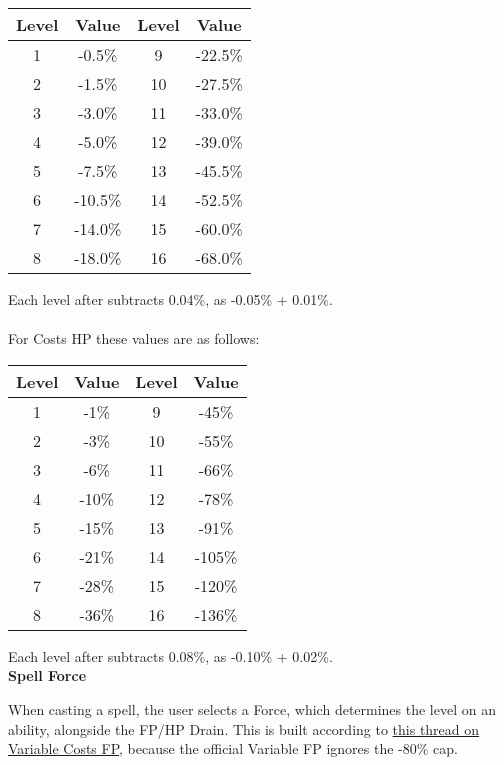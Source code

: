 \begin{multicols*}{2}
	\begin{center}\label{drain_mods}
		\begin{tabular}{|c|c|c|c|}
			\hline
			Level & Value & Level & Value \\
			\hline
			\hline
			1 & -0.5\% & 9 & -22.5\% \\
			2 & -1.5\% & 10 & -27.5\% \\
			3 & -3.0\% & 11 & -33.0\% \\
			4 & -5.0\% & 12 & -39.0\% \\
			5 & -7.5\% & 13 & -45.5\% \\
			6 & -10.5\% & 14 & -52.5\% \\
			7 & -14.0\% & 15 & -60.0\% \\
			8 & -18.0\% & 16 & -68.0\% \\
			\hline
		\end{tabular}
	\end{center}
	
	Each level after subtracts 0.04\%, as -0.05\% + 0.01\%.
	\\\\
	For Costs HP these values are as follows:
	\begin{center}
		\begin{tabular}{|c|c|c|c|}
			\hline
			Level & Value & Level & Value \\
			\hline
			\hline
			1 & -1\% & 9 & -45\% \\
			2 & -3\% & 10 & -55\% \\
			3 & -6\% & 11 & -66\% \\
			4 & -10\% & 12 & -78\% \\
			5 & -15\% & 13 & -91\% \\
			6 & -21\% & 14 & -105\% \\
			7 & -28\% & 15 & -120\% \\
			8 & -36\% & 16 & -136\% \\
			\hline
		\end{tabular}
	\end{center}
	
	Each level after subtracts 0.08\%, as -0.10\% + 0.02\%.\\
	
	\textbf{Spell Force\label{Spell Force}}
	
	When casting a spell, the user selects a Force, which determines the level on an ability, alongside the FP/HP Drain. This is built according to \textcolor{Blue}{\href{http://forums.sjgames.com/showpost.php?p=1399558&postcount=27}{this thread on Variable Costs FP}}, because the official Variable FP ignores the -80\% cap.
	

\end{multicols*}
